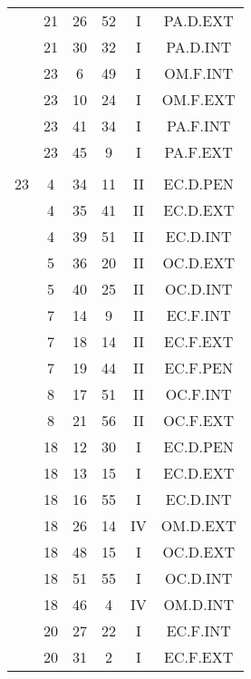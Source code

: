 \documentclass[12pt, a4paper]{article}
\begin{document}
\begin{multicols}{3}
{\begin{tabular}{c c c c c c}
	 	 	 	 & 21 & 26 & 52 & I & PA.D.EXT\\%
	 	 	 	 & 21 & 30 & 32 & I & PA.D.INT\\%
	 	 	 	 & 23 & 6 & 49 & I & OM.F.INT\\%
	 	 	 	 & 23 & 10 & 24 & I & OM.F.EXT\\%
	 	 	 	 & 23 & 41 & 34 & I & PA.F.INT\\%
	 	 	 	 & 23 & 45 & 9 & I & PA.F.EXT\\%
	 	 	 	 & & & & & \\%
	 	 	 	23 & 4 & 34 & 11 & II & EC.D.PEN\\%
	 	 	 	 & 4 & 35 & 41 & II & EC.D.EXT\\%
	 	 	 	 & 4 & 39 & 51 & II & EC.D.INT\\%
	 	 	 	 & 5 & 36 & 20 & II & OC.D.EXT\\%
	 	 	 	 & 5 & 40 & 25 & II & OC.D.INT\\%
	 	 	 	 & 7 & 14 & 9 & II & EC.F.INT\\%
	 	 	 	 & 7 & 18 & 14 & II & EC.F.EXT\\%
	 	 	 	 & 7 & 19 & 44 & II & EC.F.PEN\\%
	 	 	 	 & 8 & 17 & 51 & II & OC.F.INT\\%
	 	 	 	 & 8 & 21 & 56 & II & OC.F.EXT\\%
	 	 	 	 & 18 & 12 & 30 & I & EC.D.PEN\\%
	 	 	 	 & 18 & 13 & 15 & I & EC.D.EXT\\%
	 	 	 	 & 18 & 16 & 55 & I & EC.D.INT\\%
	 	 	 	 & 18 & 26 & 14 & IV & OM.D.EXT\\%
	 	 	 	 & 18 & 48 & 15 & I & OC.D.EXT\\%
	 	 	 	 & 18 & 51 & 55 & I & OC.D.INT\\%
	 	 	 	 & 18 & 46 & 4 & IV & OM.D.INT\\%
	 	 	 	 & 20 & 27 & 22 & I & EC.F.INT\\%
	 	 	 	 & 20 & 31 & 2 & I & EC.F.EXT\\%
	 	 \end{tabular}
 	}
\end{multicols}
\end{document}
